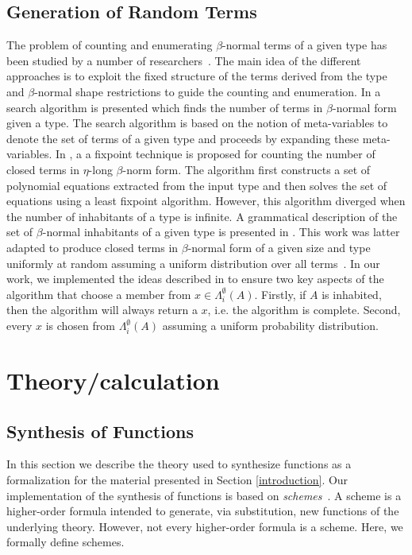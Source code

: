 \subsection{Generation of Random Terms}
The problem of counting and enumerating $\beta$-normal terms of a given type has been studied by a number of researchers~\cite{hindley1997basic,takahashi1996normal,zaionc1995fixpoint,wang2005generating}. The main idea of the different approaches is to exploit the fixed structure of the terms derived from the type and $\beta$-normal shape restrictions to guide the counting and enumeration. In \cite{hindley1997basic} a search algorithm is presented which finds the number of terms in $\beta$-normal form given a type. The search algorithm is based on the notion of meta-variables to denote the set of terms of a given type and proceeds by expanding these meta-variables.
In \cite{zaionc1995fixpoint}, a a fixpoint technique is proposed for counting the number of closed terms in $\eta$-long $\beta$-norm form. The algorithm first constructs a set of polynomial equations extracted from the input type and then solves the set of equations using a least fixpoint algorithm. However, this algorithm diverged when the number of inhabitants of a type is infinite. A grammatical description of the set of $\beta$-normal inhabitants of a given type is presented in \cite{takahashi1996normal}. This work was latter adapted to produce closed terms in $\beta$-normal form of a given size and type uniformly at random assuming a uniform distribution over all terms~\cite{wang2005generating}. In our work, we implemented the ideas described in \cite{wang2005generating} to ensure two key aspects of the algorithm that choose a member from $x \in \Lambda_i^{\emptyset}(A)$. Firstly, if $A$ is inhabited, then the algorithm will always return a $x$, i.e. the algorithm is complete. Second, every $x$ is chosen from $\Lambda_i^{\emptyset}(A)$ assuming a uniform probability distribution.

\section{Theory/calculation}

\subsection{Synthesis of Functions}
\label{sec:synthesis}
In this section we describe the theory used to synthesize functions as a formalization for the material presented in Section \ref{introduction}. Our implementation of the synthesis of functions is based on {\em schemes}~\cite{Montano-Rivas:eswa}. A scheme is a higher-order formula intended to generate, via substitution, new functions of the underlying theory. However, not every higher-order formula is a scheme. Here, we formally define schemes.


